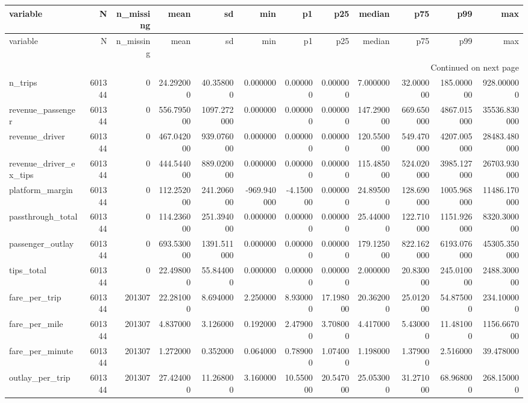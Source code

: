 \begin{longtable}{lrrrrrrrrrrr}
\toprule
variable & N & n_missing & mean & sd & min & p1 & p25 & median & p75 & p99 & max \\
\midrule
\endfirsthead
\toprule
variable & N & n_missing & mean & sd & min & p1 & p25 & median & p75 & p99 & max \\
\midrule
\endhead
\midrule
\multicolumn{12}{r}{Continued on next page} \\
\midrule
\endfoot
\bottomrule
\endlastfoot
n_trips & 601344 & 0 & 24.292000 & 40.358000 & 0.000000 & 0.000000 & 0.000000 & 7.000000 & 32.000000 & 185.000000 & 928.000000 \\
revenue_passenger & 601344 & 0 & 556.795000 & 1097.272000 & 0.000000 & 0.000000 & 0.000000 & 147.290000 & 669.650000 & 4867.015000 & 35536.830000 \\
revenue_driver & 601344 & 0 & 467.042000 & 939.076000 & 0.000000 & 0.000000 & 0.000000 & 120.550000 & 549.470000 & 4207.005000 & 28483.480000 \\
revenue_driver_ex_tips & 601344 & 0 & 444.544000 & 889.020000 & 0.000000 & 0.000000 & 0.000000 & 115.485000 & 524.020000 & 3985.127000 & 26703.930000 \\
platform_margin & 601344 & 0 & 112.252000 & 241.206000 & -969.940000 & -4.150000 & 0.000000 & 24.895000 & 128.690000 & 1005.968000 & 11486.170000 \\
passthrough_total & 601344 & 0 & 114.236000 & 251.394000 & 0.000000 & 0.000000 & 0.000000 & 25.440000 & 122.710000 & 1151.926000 & 8320.300000 \\
passenger_outlay & 601344 & 0 & 693.530000 & 1391.511000 & 0.000000 & 0.000000 & 0.000000 & 179.125000 & 822.162000 & 6193.076000 & 45305.350000 \\
tips_total & 601344 & 0 & 22.498000 & 55.844000 & 0.000000 & 0.000000 & 0.000000 & 2.000000 & 20.830000 & 245.010000 & 2488.300000 \\
fare_per_trip & 601344 & 201307 & 22.281000 & 8.694000 & 2.250000 & 8.930000 & 17.198000 & 20.362000 & 25.012000 & 54.875000 & 234.100000 \\
fare_per_mile & 601344 & 201307 & 4.837000 & 3.126000 & 0.192000 & 2.479000 & 3.708000 & 4.417000 & 5.430000 & 11.481000 & 1156.667000 \\
fare_per_minute & 601344 & 201307 & 1.272000 & 0.352000 & 0.064000 & 0.789000 & 1.074000 & 1.198000 & 1.379000 & 2.516000 & 39.478000 \\
outlay_per_trip & 601344 & 201307 & 27.424000 & 11.268000 & 3.160000 & 10.550000 & 20.547000 & 25.053000 & 31.271000 & 68.968000 & 268.150000 \\

\end{longtable}
